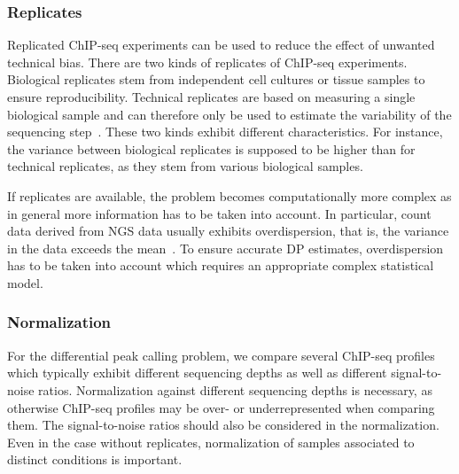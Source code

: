 \subsubsection{Replicates}
\label{sec_challenges_rep}
Replicated ChIP-seq experiments can be used to reduce the effect of unwanted technical bias.
There are two kinds of replicates of ChIP-seq experiments.
Biological replicates stem from independent cell cultures or tissue samples to ensure reproducibility.
Technical replicates are based on measuring a single biological sample and can therefore only be used to estimate the variability of the sequencing step~\citep{Yang2014}.
These two kinds exhibit different characteristics.
For instance, the variance between biological replicates is supposed to be higher than for technical replicates, as they stem from various biological samples.

If replicates are available, the problem becomes computationally more complex as in general more information has to be taken into account.
In particular, count data derived from NGS data usually exhibits overdispersion, that is, the variance in the data exceeds the mean~\citep{anders2010, Cameron1999, Ismail2007}.
To ensure accurate DP estimates, overdispersion has to be taken into account which requires an appropriate complex statistical model.

\subsubsection{Normalization}
\label{sec_challenges_norm}
For the differential peak calling problem, we compare several ChIP-seq profiles which typically exhibit different sequencing depths as well as different signal-to-noise ratios.
Normalization against different sequencing depths is necessary, as otherwise ChIP-seq profiles may be over- or underrepresented when comparing them.
The signal-to-noise ratios should also be considered in the normalization.
Even in the case without replicates, normalization of samples associated to distinct conditions is important.

